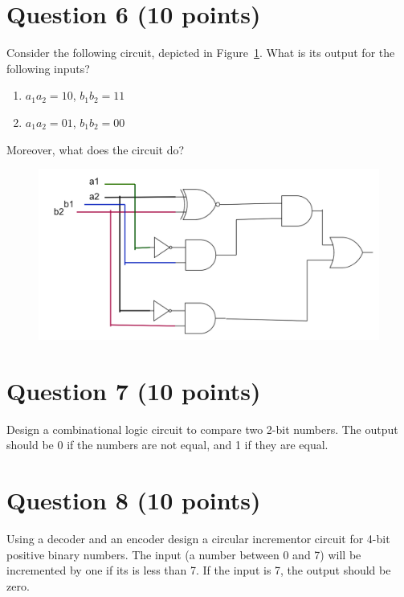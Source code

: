 \documentclass{article}
\begin{document}
	
	\section*{Question 6 (10 points)}
	Consider the following circuit, depicted in Figure~\ref{fig:hw1-q6}. What is its output for the following inputs?
	\begin{enumerate}
		\item $a_1 a_2 = 10$,  $b_1 b_2= 11$
		\item $a_1 a_2 = 01$,   $b_1 b_2 = 00$
	\end{enumerate}
	Moreover, what does the circuit do? 
	\begin{figure}[H]
		\centering
		\includegraphics[width=0.7\linewidth]{./images/hw1-q6}
		\caption{}
		\label{fig:hw1-q6}
	\end{figure}
	
	\begin{solution}
	\end{solution}
	\section*{Question 7 (10 points)}
	Design a combinational logic circuit to compare two 2-bit numbers. The output should be 0 if the numbers are not equal, and 1 if they are equal.

	\begin{solution}
	\end{solution}
	
	
	\section*{Question 8 (10 points)}
	Using a decoder and an encoder design a circular incrementor circuit for 4-bit positive binary numbers. The input (a number between 0 and 7) will be incremented by one if its is less than 7. If the input is 7, the output should be zero.
	
\end{document}
